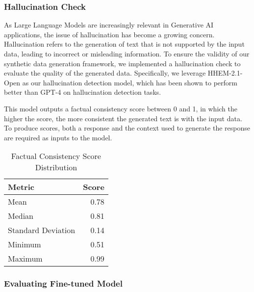 \subsubsection{Hallucination Check}

As Large Language Models are increasingly relevant in Generative AI applications, the issue of hallucination has become a growing concern.
Hallucination refers to the generation of text that is not supported by the input data, leading to incorrect or misleading information. 
To ensure the validity of our synthetic data generation framework, we implemented a hallucination check to evaluate the quality of the generated data.
Specifically, we leverage HHEM-2.1-Open %
as our hallucination detection model, which has been shown to perform better than GPT-4 on hallucination detection tasks. 

This model outputs a factual consistency score between 0 and 1, in which the higher the score, the more consistent the generated text is with the input data.
To produce scores, both a response and the context used to generate the response are required as inputs to the model. 

\begin{table}[h]
\centering
\caption{Factual Consistency Score Distribution}
\begin{tabular}{lr}
\hline
Metric & Score \\
\hline
Mean & 0.78 \\
Median & 0.81 \\
Standard Deviation & 0.14 \\
Minimum & 0.51 \\
Maximum & 0.99 \\
\hline
\end{tabular}
\label{tab:factual-consistency-scores}
\end{table}

\subsubsection{Evaluating Fine-tuned Model}

